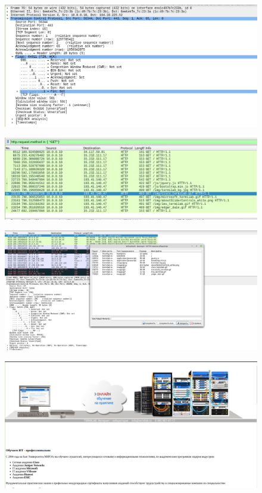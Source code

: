 \documentclass[a4paper,14pt]{extarticle}
\begin{document}
\begin{figure}
	\centering
	\includegraphics[width=0.7\linewidth]{images/pr-9/tcp-fin}
	\caption{}
	\label{fig:tcp-fin}
\end{figure}


\begin{figure}
	\centering
	\includegraphics[width=0.7\linewidth]{images/pr-9/http-get}
	\caption{}
	\label{fig:http-get}
\end{figure}


\begin{figure}
	\centering
	\includegraphics[width=0.7\linewidth]{images/pr-9/save}
	\caption{}
	\label{fig:save}
\end{figure}

\begin{figure}
	\centering
	\includegraphics[width=0.7\linewidth]{images/pr-9/saved-site}
	\caption{}
	\label{fig:saved-site}
\end{figure}
\end{document}
